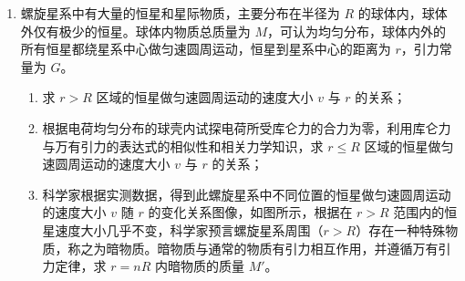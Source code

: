 \documentclass[\gkver]{gaokaozhenti}
\begin{document}
\begin{enumerate}
b．已知颗粒的电荷量与其半径的平方成正比，进入收集器的均匀混合气流包含了直径为 10 $\mu$m 和 2.5 $\mu$m 的两种颗粒，若 10 $\mu$m 的颗粒恰好 100\% 被收集，求 2.5 $\mu$m 的颗粒被收集的百分比。
\begin{enumerate}
	\item
	若不计空气阻力，质量为 $m$、电荷量为 $- q$ 的颗粒恰好全部被收集，求两金属板间的电压 $U_{1}$；
	\item
	若计空气阻力，颗粒所受阻力与其相对于空气的速度 $v$ 方向相反，大小为 $f = krv$，其中 $r$ 为颗粒的半径，$k$ 为常量。假设颗粒在金属板间经极短时间加速达到最大速度。
\end{enumerate}

\item
螺旋星系中有大量的恒星和星际物质，主要分布在半径为 $R$ 的球体内，球体外仅有极少的恒星。球体内物质总质量为 $M$，可认为均匀分布，球体内外的所有恒星都绕星系中心做匀速圆周运动，恒星到星系中心的距离为 $r$，引力常量为 $G$。
\begin{enumerate}
	\item
	求 $r > R$ 区域的恒星做匀速圆周运动的速度大小 $v$ 与 $r$ 的关系；
	\item
	根据电荷均匀分布的球壳内试探电荷所受库仑力的合力为零，利用库仑力与万有引力的表达式的相似性和相关力学知识，求 $r \leq R$ 区域的恒星做匀速圆周运动的速度大小 $v$ 与 $r$ 的关系；
	\item
	科学家根据实测数据，得到此螺旋星系中不同位置的恒星做匀速圆周运动的速度大小 $v$ 随 $r$ 的变化关系图像，如图所示，根据在 $r > R$ 范围内的恒星速度大小几乎不变，科学家预言螺旋星系周围（$r > R$）存在一种特殊物质，称之为暗物质。暗物质与通常的物质有引力相互作用，并遵循万有引力定律，求 $r = nR$ 内暗物质的质量 $M'$。
\end{enumerate}

\end{enumerate}
\end{document}
